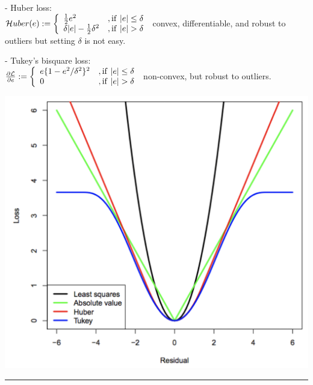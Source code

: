 - Huber loss: \\
${\cal H}u b e r(e):=\left\{\begin{array}{l l}{{\frac{1}{2}e^{2}}}&{{,\mathrm{if}\ |e|\leq\delta}}\\ {{\delta|e|-\frac{1}{2}\delta^{2}}}&{{,\mathrm{if}\ |e|>\delta}}\end{array}\right.$ convex, differentiable, and robust to outliers but setting $\delta$ is not easy.

- Tukey’s bisquare loss: \\
$\frac{\partial\mathcal{L}}{\partial e}:=\left\{\begin{array}{l l}{{e\{1-e^{2}/\delta^{2}\}^{2}}}&{{,\mathrm{if}\,\,|e|\leq\delta}}\\ {{0}}&{{,\mathrm{if} \ |e| > \delta}}\end{array}\right.$ non-convex, but robust to outliers.

\includegraphics[width=\linewidth]{loss_functions.png}

\vspace{4pt}
\hrule
\vspace{4pt}
